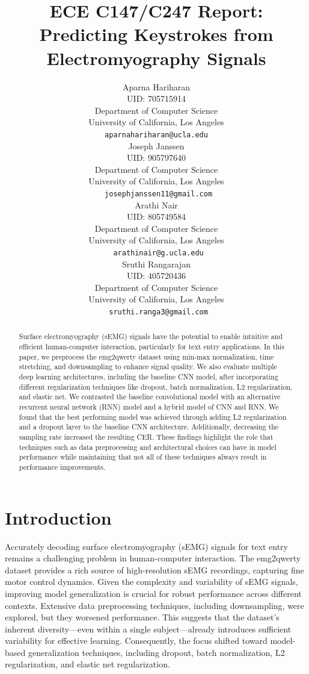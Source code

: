 \documentclass{article}
\title{ECE C147/C247 Report: Predicting Keystrokes from Electromyography Signals}
\author{
  Aparna Hariharan\\
  UID: 705715914 \\
  Department of Computer Science\\
  University of California, Los Angeles\\
  \texttt{aparnahariharan@ucla.edu} \\
    \And
    Joseph Janssen \\
    UID: 905797640 \\
  Department of Computer Science\\
  University of California, Los Angeles\\
  \texttt{
josephjanssen11@gmail.com} \\
\And
Arathi Nair\\
    UID: 805749584\\
  Department of Computer Science\\
  University of California, Los Angeles\\
  \texttt{
arathinair@g.ucla.edu} \\
\And
Sruthi Rangarajan\\
UID: 405720436 \\
  Department of Computer Science\\
  University of California, Los Angeles\\
  \texttt{
sruthi.ranga3@gmail.com} \\
}
\begin{document}
\maketitle

\begin{abstract}
  Surface electromyography (sEMG) signals have the potential to enable intuitive and efficient human-computer interaction, particularly for text entry applications. In this paper, we preprocess the emg2qwerty dataset using min-max normalization, time stretching, and downsampling to enhance signal quality. We also evaluate multiple deep learning architectures, including the baseline CNN model, after incorporating different regularization techniques like dropout, batch normalization, L2 regularization, and elastic net. We contrasted the baseline convolutional model with an alternative recurrent neural network (RNN) model and a hybrid model of CNN and RNN. We found that the best performing model was achieved through adding L2 regularization and a dropout layer to the baseline CNN architecture. Additionally, decreasing the sampling rate increased the resulting CER. These findings highlight the role that techniques such as data preprocessing and architectural choices can have in model performance while maintaining that not all of these techniques always result in performance improvements.
  
\end{abstract}


\section{Introduction}
Accurately decoding surface electromyography (sEMG) signals for text entry remains a challenging problem in human-computer interaction. The emg2qwerty dataset provides a rich source of high-resolution sEMG recordings, capturing fine motor control dynamics. Given the complexity and variability of sEMG signals, improving model generalization is crucial for robust performance across different contexts. Extensive data preprocessing techniques, including downsampling, were explored, but they worsened performance. This suggests that the dataset's inherent diversity—even within a single subject—already introduces sufficient variability for effective learning. Consequently, the focus shifted toward model-based generalization techniques, including dropout, batch normalization, L2 regularization, and elastic net regularization.
\end{document}

